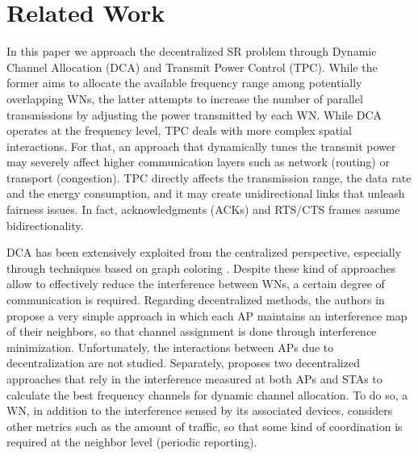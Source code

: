 \documentclass[preprint,12pt]{elsarticle}
\begin{document}
\section{Related Work}
\label{section:related_work} 		
In this paper we approach the decentralized SR problem through Dynamic Channel Allocation (DCA) and Transmit Power Control (TPC). While the former aims to allocate the available frequency range among potentially overlapping WNs, the latter attempts to increase the number of parallel transmissions by adjusting the power transmitted by each WN. While DCA operates at the frequency level, TPC deals with more complex spatial interactions. For that, an approach that dynamically tunes the transmit power may severely affect higher communication layers such as network (routing) or transport (congestion). TPC directly affects the transmission range, the data rate and the energy consumption, and it may create unidirectional links that unleash fairness issues. In fact, acknowledgments (ACKs) and RTS/CTS frames assume bidirectionality. 

DCA has been extensively exploited from the centralized perspective, especially through techniques based on graph coloring \cite{riihijarvi2005frequency, mishra2005weighted}. Despite these kind of approaches allow to effectively reduce the interference between WNs, a certain degree of communication is required. Regarding decentralized methods, the authors in \cite{akl2007dynamic} propose a very simple approach in which each AP maintains an interference map of their neighbors, so that channel assignment is done through interference minimization. Unfortunately, the interactions between APs due to decentralization are not studied. Separately, \cite{chen2007improved} proposes two decentralized approaches that rely in the interference measured at both APs and STAs to calculate the best frequency channels for dynamic channel allocation. To do so, a WN, in addition to the interference sensed by its associated devices, considers other metrics such as the amount of traffic, so that some kind of coordination is required at the neighbor level (periodic reporting). 
\end{document}
